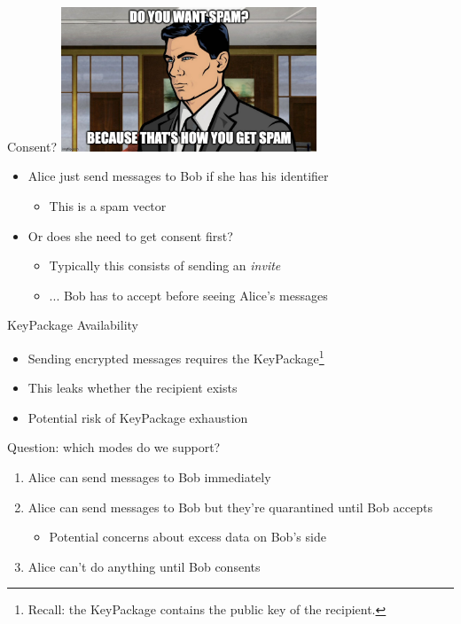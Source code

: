 \documentclass[helvetica]{beamer}
\begin{document}
\begin{frame}{Consent?}
  \includegraphics[width=3in]{archer-spam}
  \begin{itemize}
  \item Alice just send messages to Bob if she has his identifier
    \begin{itemize}
    \item This is a spam vector      
    \end{itemize}
  \item Or does she need to get consent first?
    \begin{itemize}
    \item Typically this consists of sending an \emph{invite}
    \item ... Bob has to accept before seeing Alice's messages      
    \end{itemize}
  \end{itemize}
\end{frame}


\begin{frame}{KeyPackage Availability}
  \begin{itemize}
  \item Sending encrypted messages requires the KeyPackage\footnote{Recall: the KeyPackage contains the public key of the recipient.}
  \item This leaks whether the recipient exists
  \item Potential risk of KeyPackage exhaustion
  \end{itemize}
\end{frame}

\begin{frame}{Question: which modes do we support?}
  \begin{enumerate}
  \item Alice can send messages to Bob immediately    
  \item Alice can send messages to Bob but they're quarantined until Bob accepts
    \begin{itemize}
    \item Potential concerns about excess data on Bob's side      
    \end{itemize}
  \item Alice can't do anything until Bob consents
\end{enumerate}    
\end{frame}
\end{document}
